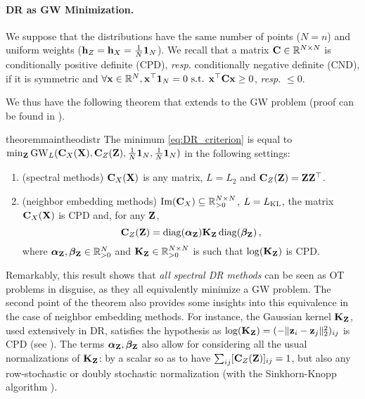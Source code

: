 \paragraph{DR as GW Minimization.} We suppose that the distributions have the same number of points ($N = n$) and uniform weights (${\mathbf{h}}_Z = {\mathbf{h}}_X = \frac{1}{N} \bm{1}_N$). We recall that a matrix ${\mathbf{C}} \in \mathbb{R}^{N \times N}$ is conditionally positive definite (CPD), \textit{resp.} conditionally negative definite (CND), if it is symmetric and $\forall {\mathbf{x}} \in \mathbb{R}^{N}, {\mathbf{x}}^\top \mathbf{1}_N = 0 \text{ s.t. } {\mathbf{x}}^\top {\mathbf{C}} {\mathbf{x}} \geq 0$, \textit{resp.} $\leq 0$. 



We thus have the following theorem that extends  to the GW problem (proof can be found in ).
\begin{restatable}{theorem}{maintheodistr}
\label{theo:main_theo}
The minimum \cref{eq:DR_criterion} is equal to $\min_{{\mathbf{Z}}}\operatorname{GW}_L({\mathbf{C}}_{X}({\mathbf{X}}), {\mathbf{C}}_{Z}({\mathbf{Z}}), \frac{1}{N}\bm{1}_N, \frac{1}{N}\bm{1}_N)$ in the following settings:
\begin{enumerate}[label=(\roman*)]
\item (spectral methods)  ${\mathbf{C}}_{X}({\mathbf{X}})$ is any matrix, $L = L_2$ and ${\mathbf{C}}_{Z}({\mathbf{Z}}) = {\mathbf{Z}} {\mathbf{Z}}^\top$. 
\item (neighbor embedding methods) $\operatorname{Im}({\mathbf{C}}_{X}) \subseteq \mathbb{R}_{>0}^{N \times N}$, $L = L_{\operatorname{KL}}$, the matrix ${\mathbf{C}}_{X}({\mathbf{X}})$ is CPD and, for any ${\mathbf{Z}}$,
\begin{equation}
{\mathbf{C}}_{Z}({\mathbf{Z}}) = \operatorname{diag}(\boldsymbol\alpha_{\mathbf{Z}}) {\mathbf{K}}_{\mathbf{Z}} \operatorname{diag}(\boldsymbol\beta_{\mathbf{Z}})\,,
\end{equation}
where $\boldsymbol\alpha_{\mathbf{Z}}, \boldsymbol\beta_{\mathbf{Z}} \in \mathbb{R}^{N}_{> 0}$ and ${\mathbf{K}}_{\mathbf{Z}} \in \mathbb{R}^{N \times N}_{> 0}$ is such that $\log({\mathbf{K}}_{\mathbf{Z}})$ is CPD.
\end{enumerate}
\end{restatable}

Remarkably, this result shows that \emph{all spectral DR methods} can be seen as OT problems in disguise, as they all equivalently minimize a GW problem. The second point of the theorem also provides some insights into this equivalence in the case of neighbor embedding methods. For instance, the Gaussian kernel ${\mathbf{K}}_{\mathbf{Z}}$, used extensively in DR, satisfies the hypothesis as $\log({\mathbf{K}}_{\mathbf{Z}}) = (-\|{\mathbf{z}}_i-{\mathbf{z}}_j\|_2^2)_{ij}$ is CPD (see \eg \citealt{maron2018probably}). The terms $\boldsymbol\alpha_{\mathbf{Z}}, \boldsymbol\beta_{\mathbf{Z}}$ also allow for considering all the usual normalizations of ${\mathbf{K}}_{\mathbf{Z}}$: by a scalar so as to have $\sum_{ij} [{\mathbf{C}}_{Z}({\mathbf{Z}})]_{ij}=1$, but also any row-stochastic or doubly stochastic normalization (with the Sinkhorn-Knopp algorithm \citealt{sinkhorn1967concerning}).

